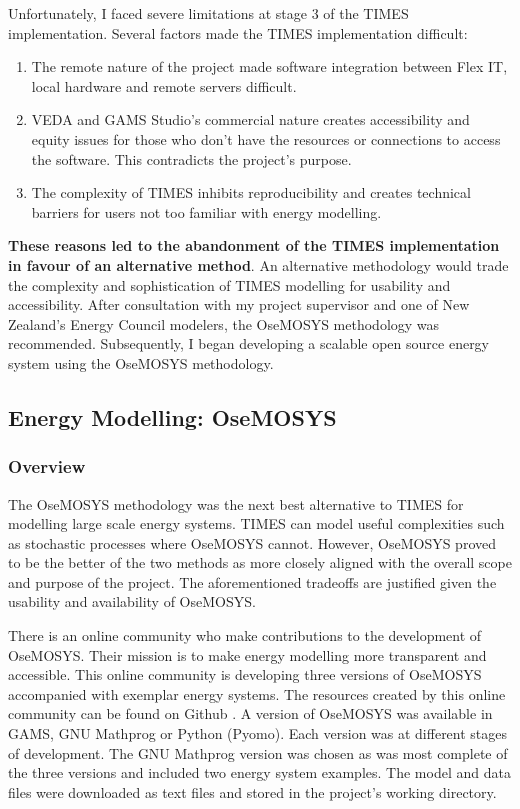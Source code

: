 \documentclass[12pt]{article}
\begin{document}
Unfortunately, I faced severe limitations at stage 3 of the TIMES implementation.
Several factors made the TIMES implementation difficult:
\begin{enumerate}
	\item The remote nature of the project made software integration between Flex IT, local hardware and remote servers difficult.
	\item VEDA and GAMS Studio's commercial nature creates accessibility and equity issues for those who don't have the resources or connections to access the software. This contradicts the project's purpose.
	\item The complexity of TIMES inhibits reproducibility and creates technical barriers for users not too familiar with energy modelling.
\end{enumerate}

\textbf{These reasons led to the abandonment of the TIMES implementation in favour of an alternative method}. 
An alternative methodology would trade the complexity and sophistication of TIMES modelling for usability and accessibility. 
After consultation with my project supervisor and one of New Zealand's Energy Council modelers, the OseMOSYS methodology was recommended.
Subsequently, I began developing a scalable open source energy system using the OseMOSYS methodology.

\subsection{Energy Modelling: OseMOSYS}
\subsubsection{Overview}\label{OseMOSYS}
The OseMOSYS methodology was the next best alternative to TIMES for modelling large scale energy systems.
TIMES can model useful complexities such as stochastic processes where OseMOSYS cannot.
However, OseMOSYS proved to be the better of the two methods as more closely aligned with the overall scope and purpose of the project.
The aforementioned tradeoffs are justified given the usability and availability of OseMOSYS.

There is an online community who make contributions to the development of OseMOSYS.
Their mission is to make energy modelling more transparent and accessible.
This online community is developing three versions of OseMOSYS accompanied with exemplar energy systems.
The resources created by this online community can be found on Github \cite{GHOM}.
A version of OseMOSYS was available in GAMS, GNU Mathprog or Python (Pyomo).
Each version was at different stages of development. 
The GNU Mathprog version was chosen as was most complete of the three versions and included two energy system examples.
The model and data files were downloaded as text files and stored in the project's working directory.
\end{document}
